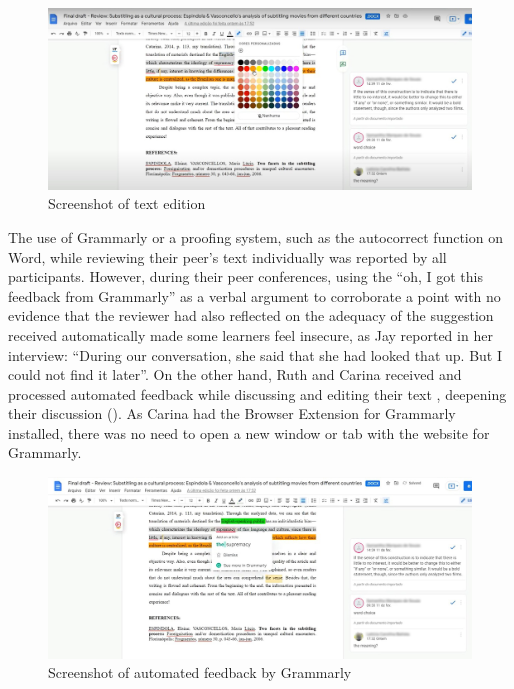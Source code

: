 \documentclass[english]{textolivre}
\begin{document}
\begin{figure}[h!]
\centering
\begin{minipage}{.8\textwidth}
 \includegraphics[width=\textwidth]{Fig2.jpeg}
 \caption{Screenshot of text edition}
 \label{fig2}
\end{minipage}
\end{figure}

The use of Grammarly or a proofing system, such as the autocorrect function on Word, while reviewing their peer’s text individually was reported by all participants. However, during their peer conferences, using the “oh, I got this feedback from Grammarly” as a verbal argument to corroborate a point with no evidence that the reviewer had also reflected on the adequacy of the suggestion received automatically made some learners feel insecure, as Jay reported in her interview: “During our conversation, she said that she had looked that up. But I could not find it later”. On the other hand, Ruth and Carina received and processed automated feedback while discussing and editing their text , deepening their discussion (). As Carina had the Browser Extension for Grammarly installed, there was no need to open a new window or tab with the website for Grammarly.

\begin{figure}[h!]
\centering
\begin{minipage}{.8\textwidth}
 \includegraphics[width=\textwidth]{Fig3.jpeg}
 \caption{Screenshot of automated feedback by Grammarly}
 \label{fig3}
\end{minipage}
\end{figure}
\end{document}
